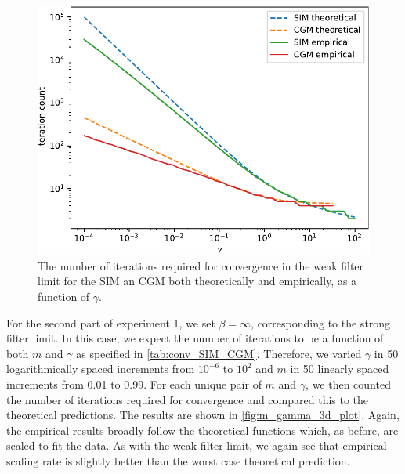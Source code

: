 \begin{figure}[t]
    \begin{center} 
    \includegraphics[width=0.7\linewidth]{Figures/gamma_plot_2d.pdf}
    \end{center}
    \caption{\small{The number of iterations required for convergence in the weak filter limit for the SIM an CGM both theoretically and empirically, as a function of $\gamma$.}}
    \label{fig:gamma_2d_plot}
\end{figure}


For the second part of experiment 1, we set $\beta = \infty$, corresponding to the strong filter limit. In this case, we expect the number of iterations to be a function of both $m$ and $\gamma$ as specified in \cref{tab:conv_SIM_CGM}. Therefore, we varied $\gamma$ in 50 logarithmically spaced increments from $10^{-6}$ to $10^2$ and $m$ in 50 linearly spaced increments from 0.01 to 0.99. For each unique pair of $m$ and $\gamma$, we then counted the number of iterations required for convergence and compared this to the theoretical predictions. The results are shown in \cref{fig:m_gamma_3d_plot}. Again, the empirical results broadly follow the theoretical functions which, as before, are scaled to fit the data. As with the weak filter limit, we again see that empirical scaling rate is slightly better than the worst case theoretical prediction. 

